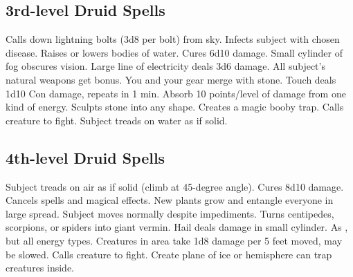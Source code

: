 \subsection{3rd-level Druid Spells}
\begin{spelllist}
 Calls down lightning bolts (3d8 per bolt) from sky.
 Infects subject with chosen disease.
 Raises or lowers bodies of water.
 Cures 6d10 damage.
 Small cylinder of fog obscures vision.
 Large line of electricity deals 3d6 damage.
 All subject's natural weapons get  bonus.
 You and your gear merge with stone.
 Touch deals 1d10 Con damage, repeats in 1 min.
 Absorb 10 points/level of damage from one kind of energy.
 Sculpts stone into any shape.
 Creates a magic booby trap.
 Calls creature to fight.
 Subject treads on water as if solid.
\end{spelllist}

\subsection{4th-level Druid Spells}
\begin{spelllist}
 Subject treads on air as if solid (climb at 45-degree angle).
 Cures 8d10 damage.
 Cancels spells and magical effects.
 New plants grow and entangle everyone in large spread.
 Subject moves normally despite impediments.
 Turns centipedes, scorpions, or spiders into giant vermin.
 Hail deals damage in small cylinder.
 As , but all energy types.
 Creatures in area take 1d8 damage per 5 feet moved, may be slowed.
 Calls creature to fight.
 Create plane of ice or hemisphere can trap creatures inside.
\end{spelllist}


